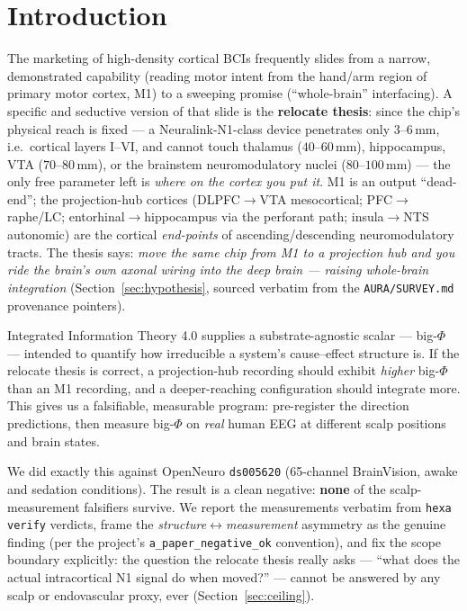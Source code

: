 \documentclass[11pt,a4paper]{article}
\begin{document}
\tableofcontents
\bigskip

\section{Introduction}\label{sec:intro}

The marketing of high-density cortical BCIs frequently slides from a narrow,
demonstrated capability (reading motor intent from the hand/arm region of
primary motor cortex, M1) to a sweeping promise (``whole-brain'' interfacing).
A specific and seductive version of that slide is the \textbf{relocate
thesis}: since the chip's physical reach is fixed --- a Neuralink-N1-class
device penetrates only $3$--$6\,$mm, i.e.\ cortical layers I--VI, and cannot
touch thalamus ($40$--$60\,$mm), hippocampus, VTA ($70$--$80\,$mm), or the
brainstem neuromodulatory nuclei ($80$--$100\,$mm) --- the only free parameter
left is \emph{where on the cortex you put it}. M1 is an output ``dead-end'';
the projection-hub cortices (DLPFC$\to$VTA mesocortical; PFC$\to$raphe/LC;
entorhinal$\to$hippocampus via the perforant path; insula$\to$NTS autonomic)
are the cortical \emph{end-points} of ascending/descending neuromodulatory
tracts. The thesis says: \emph{move the same chip from M1 to a projection hub
and you ride the brain's own axonal wiring into the deep brain --- raising
whole-brain integration} (Section~\ref{sec:hypothesis}, sourced verbatim from
the \texttt{AURA/SURVEY.md} provenance pointers).

Integrated Information Theory 4.0 \citep{albantakis2023iit4} supplies a
substrate-agnostic scalar --- big-$\Phi$ --- intended to quantify how
irreducible a system's cause--effect structure is. If the relocate thesis is
correct, a projection-hub recording should exhibit \emph{higher} big-$\Phi$
than an M1 recording, and a deeper-reaching configuration should integrate
more. This gives us a falsifiable, measurable program: pre-register the
direction predictions, then measure big-$\Phi$ on \emph{real} human EEG at
different scalp positions and brain states.

We did exactly this against OpenNeuro \texttt{ds005620} (65-channel
BrainVision, awake and sedation conditions). The result is a clean negative:
\textbf{none} of the scalp-measurement falsifiers survive. We report the
measurements verbatim from \texttt{hexa verify} verdicts, frame the
\emph{structure}$\leftrightarrow$\emph{measurement} asymmetry as the genuine
finding (per the project's \texttt{a\_paper\_negative\_ok} convention), and
fix the scope boundary explicitly: the question the relocate thesis really
asks --- ``what does the actual intracortical N1 signal do when moved?'' ---
cannot be answered by any scalp or endovascular proxy, ever
(Section~\ref{sec:ceiling}).
\end{document}
